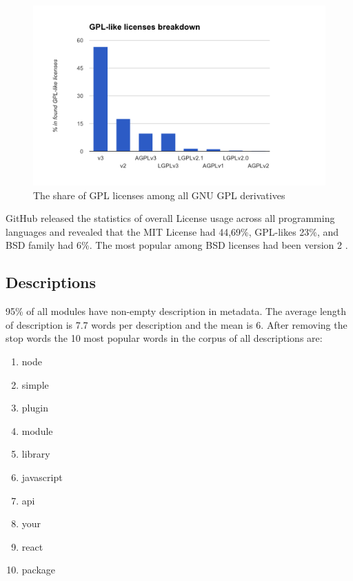 \documentclass[thesis=M,english]{FITthesis}[2012/10/20]
\begin{document}
\begin{center}
\begin{figure}[h!]
	\hspace*{-1cm}\includegraphics[totalheight=265pt]{images/npm_licenses_gpl.png}
	\caption{The share of GPL licenses among all GNU GPL derivatives}
	\label{fig: npm_licenses_gpl}
\end{figure}
\end{center}

GitHub released the statistics of overall License usage across all programming languages and revealed that the MIT License had 44,69\%, GPL-likes 23\%, and BSD family had 6\%. The most popular among BSD licenses had been version 2 \cite{gh_licenses_share}. \\

\subsection{Descriptions}

95\% of all modules have non-empty description in metadata. The average length of description is 7.7 words per description and  the mean is 6. After removing the stop words the 10 most popular words in the corpus of all descriptions are:

\begin{multicols}{2}
\begin{enumerate}
\item node
\item simple
\item plugin
\item module
\item library
\item javascript
\item api
\item your
\item react
\item package
\end{enumerate}
\end{multicols}
\end{document}
